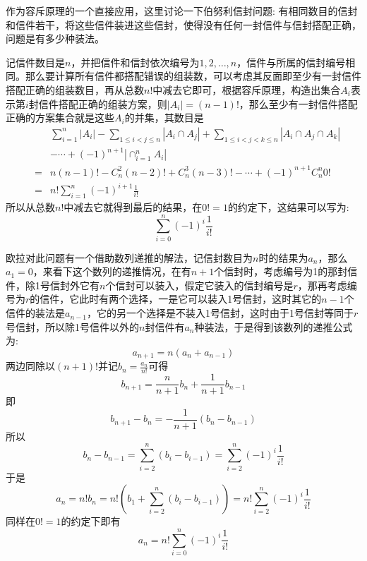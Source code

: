 \begin{example}
  作为容斥原理的一个直接应用，这里讨论一下伯努利信封问题: 有相同数目的信封和信件若干，将这些信件装进这些信封，使得没有任何一封信件与信封搭配正确，问题是有多少种装法。

  记信件数目是$n$，并把信件和信封依次编号为$1,2,\ldots,n$，信件与所属的信封编号相同。那么要计算所有信件都搭配错误的组装数，可以考虑其反面即至少有一封信件搭配正确的组装数目，再从总数$n!$中减去它即可，根据容斥原理，构造出集合$A_i$表示第$i$封信件搭配正确的组装方案，则$|A_i|=(n-1)!$，那么至少有一封信件搭配正确的方案集合就是这些$A_i$的并集，其数目是
  \begin{eqnarray*}
 &  &    \sum_{i=1}^n|A_i|-\sum_{1\leqslant i <j \leqslant n}|A_i \cap A_j|+\sum_{1 \leqslant i <j <k \leqslant n}|A_i\cap A_j \cap A_k| \\
  &    & -\cdots+(-1)^{n+1}|\cap_{i=1}^nA_i| \\
   &   = & n (n-1)! - C_n^2(n-2)! + C_n^3(n-3)! - \cdots + (-1)^{n+1}C_n^n0! \\
    &  = & n!\sum_{i=1}^n(-1)^{i+1}\frac{1}{i!}
  \end{eqnarray*}
  所以从总数$n!$中减去它就得到最后的结果，在$0!=1$的约定下，这结果可以写为:
  \begin{equation}
    \label{eq:bernoulli-envelope-problem-solution}
    \sum_{i=0}^n(-1)^i \frac{1}{i!}
  \end{equation}

  欧拉对此问题有一个借助数列递推的解法，记信封数目为$n$时的结果为$a_n$，那么$a_1=0$，来看下这个数列的递推情况，在有$n+1$个信封时，考虑编号为1的那封信件，除1号信封外它有$n$个信封可以装入，假定它装入的信封编号是$r$，那再考虑编号为$r$的信件，它此时有两个选择，一是它可以装入1号信封，这时其它的$n-1$个信件的装法是$a_{n-1}$，它的另一个选择是不装入1号信封，这时由于1号信封等同于$r$号信封，所以除1号信件以外的$n$封信件有$a_n$种装法，于是得到该数列的递推公式为:
  \begin{equation*}
    a_{n+1}=n(a_n+a_{n-1})
  \end{equation*}
  两边同除以$(n+1)!$并记$b_n=\frac{a_n}{n!}$可得
  \begin{equation*}
    b_{n+1}=\frac{n}{n+1}b_n+\frac{1}{n+1}b_{n-1}
  \end{equation*}
  即
  \begin{equation*}
    b_{n+1}-b_n=-\frac{1}{n+1}(b_n-b_{n-1})
  \end{equation*}
  所以
  \begin{equation*}
    b_n-b_{n-1}= \sum_{i=2}^{n}(b_i-b_{i-1})= \sum_{i=2}^n (-1)^{i}\frac{1}{i!}
  \end{equation*}
  于是
  \begin{equation*}
    a_n= n!b_n = n!(b_1 + \sum_{i=2}^n(b_i-b_{i-1})) = n! \sum_{i=2}^n(-1)^{i}\frac{1}{i!}
  \end{equation*}
  同样在$0!=1$的约定下即有
  \begin{equation*}
    a_n = n!\sum_{i=0}^n(-1)^{i}\frac{1}{i!}
  \end{equation*}
\end{example}

